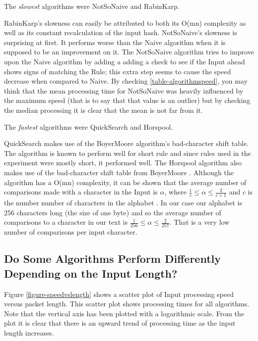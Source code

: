 \documentclass[11pt]{article}
\begin{document}
The \textit{slowest} algorithms were NotSoNaive and RabinKarp.

RabinKarp's \citep{karp1987} slowness can easily be attributed to both its O(mn) complexity as well as its constant recalculation of the input hash. 
NotSoNaive's \citep{hancart1993} slowness is surprising at first. It performs worse than the Naive algorithm when it is supposed to be an improvement on it. The NotSoNaive algorithm tries to improve upon the Naive algorithm by adding a adding a check to see if the Input ahead shows signs of matching the Rule; this extra step seems to cause the speed decrease when compared to Naive. By checking \ref{table-algorithmspeed}, you may think that the mean processing time for NotSoNaive was heavily influenced by the maximum speed (that is to say that that value is an outlier) but by checking the median processing it is clear that the mean is not far from it.

The \textit{fastest} algorithms were QuickSearch and Horspool.

QuickSearch \citep{sunday1990} makes use of the BoyerMoore \citep{boyer1977} algorithm's bad-character shift table. The algorithm is known to perform well for short rule \citep{leqroc1995} and since rules used in the experiment were mostly short, it performed well.
The Horspool \citep{horspool1980} algorithm also makes use of the bad-character shift table from BoyerMoore \citep{boyer1977}. Although the algorithm has a O(mn) complexity, it can be shown that the average number of comparisons made with a character in the Input is $\alpha$, where $\frac{1}{c} \leq \alpha \leq \frac{2}{c+1}$ and $c$ is the number number of characters in the alphabet \citep{baezayates1992b}. In our case our alphabet is 256 characters long (the size of one byte) and so the average number of comparisons to a character in our text is $\frac{1}{256} \leq \alpha \leq \frac{2}{257}$. That is a very low number of comparisons per input character.

\subsection{Do Some Algorithms Perform Differently Depending on the Input Length?}

Figure \ref{figure-speedvslength} shows a scatter plot of Input processing speed versus packet length. This scatter plot shows processing times for all algorithms. Note that the vertical axis has been plotted with a logarithmic scale. From the plot it is clear that there is an upward trend of processing time as the input length increases.
\end{document}
